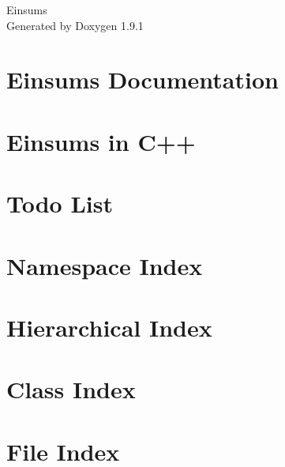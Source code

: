 \let\mypdfximage\pdfximage\def\pdfximage{\immediate\mypdfximage}\documentclass[twoside]{book}
\newcommand{\+}{\discretionary{\mbox{\scriptsize$\hookleftarrow$}}{}{}}
\newcommand{\clearemptydoublepage}{%
  \newpage{\pagestyle{empty}\cleardoublepage}%
}
\begin{document}
\raggedbottom

\hypersetup{pageanchor=false,
             bookmarksnumbered=true,
             pdfencoding=unicode
            }
\begin{titlepage}
\vspace*{7cm}
\begin{center}%
{\Large Einsums }\\
\vspace*{1cm}
{\large Generated by Doxygen 1.9.1}\\
\end{center}
\end{titlepage}
\clearemptydoublepage
{}
\tableofcontents
\clearemptydoublepage
{}
\hypersetup{pageanchor=true}

\chapter{Einsums Documentation}
\label{index}\hypertarget{index}{}
\chapter{Einsums in C++}
\label{md_README}

\chapter{Todo List}
\label{todo}

\chapter{Namespace Index}

\chapter{Hierarchical Index}

\chapter{Class Index}

\chapter{File Index}

\end{document}
